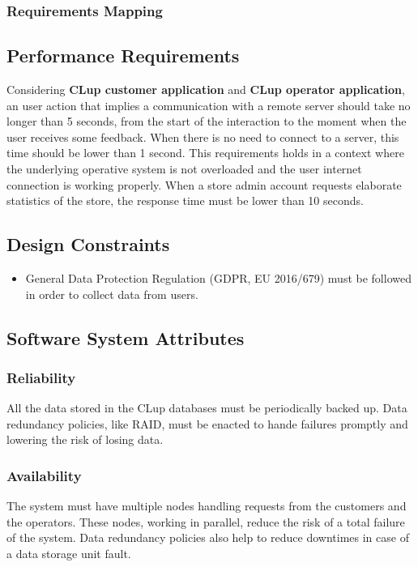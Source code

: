 \subsubsection{Requirements Mapping}
\subsection{Performance Requirements}
Considering \textbf{CLup customer application} and \textbf{CLup operator application}, an user action that implies a communication with a remote server should take no longer than 5 seconds, from the start of the interaction to the moment when the user receives some feedback. When there is no need to connect to a server, this time should be lower than 1 second. This requirements holds in a context where the underlying operative system is not overloaded and the user internet connection is working properly.
\smallskip
When a store admin account requests elaborate statistics of the store, the response time must be lower than 10 seconds.
\subsection{Design Constraints}

\begin{itemize}
    \item General Data Protection Regulation (GDPR, EU 2016/679) must be followed in order to collect data from users.
\end{itemize}

\subsection{Software System Attributes}
\subsubsection{Reliability}
All the data stored in the CLup databases must be periodically backed up. Data redundancy policies, like RAID, must be enacted to hande failures promptly and lowering the risk of losing data.

\subsubsection{Availability}
The system must have multiple nodes handling requests from the customers and the operators. These nodes, working in parallel, reduce the risk of a total failure of the system. Data redundancy policies also help to reduce downtimes in case of a data storage unit fault.

